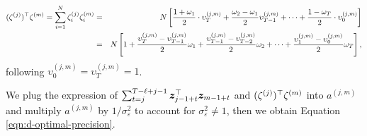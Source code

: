 		\begin{eqnarray*}
			(\zeta^{(j)})^\top \zeta^{(m)} = \sum_{i = 1}^{N} \zeta_i^{(j)} \zeta_i^{(m)}  &=& N \left[ \frac{1 + \omega_1}{2} \cdot \upsilon^{(j,m)}_T + \frac{ \omega_2 -  \omega_1}{2} \upsilon^{(j,m)}_{T-1} + \cdots  + \frac{1 - \omega_T}{2} \cdot \upsilon^{(j,m)}_0 \right] \\
			&=& N \left[ 1 + \frac{\upsilon^{(j,m)}_T - \upsilon^{(j,m)}_{T-1}}{2}  \omega_1 + \frac{\upsilon^{(j,m)}_{T-1} - \upsilon^{(j,m)}_{T-2}}{2}  \omega_2  + \cdots + \frac{\upsilon^{(j,m)}_1 - \upsilon^{(j,m)}_0}{2} \omega_T  \right],
		\end{eqnarray*}
		following $\upsilon^{(j,m)}_0 = \upsilon^{(j,m)}
		_T = 1$.  

		We plug the expression of $\sum_{t=j}^{T - \ell+j-1} \bm{z}_{j-1+t}^\top \bm{z}_{m-1+t} $ and $(\zeta^{(j)})^\top \zeta^{(m)} $ into $a^{(j,m)}$ and multiply $a^{(j,m)}$ by $1/\sigma_\varepsilon^2$ to account for $\sigma_\varepsilon^2 \neq 1$, then we obtain Equation \eqref{eqn:d-optimal-precision}.
		
